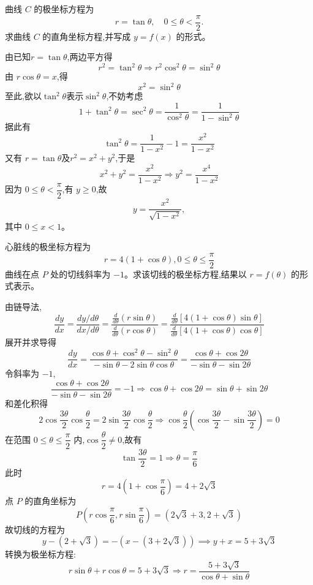 \begin{questions}
    \question 曲线 $C$ 的极坐标方程为
    \[
    r=\tan\theta,\quad 0\le\theta<\frac{\pi}{2}.
    \]
    求曲线 $C$ 的直角坐标方程,并写成 $y=f(x)$ 的形式。
    \begin{solution}
        由已知$r=\tan\theta$,两边平方得
        \[
        r^2=\tan^2\theta \Rightarrow r^2\cos^2\theta=\sin^2\theta
        \]
        由 $r\cos\theta=x$,得
        \[
        x^2=\sin^2\theta
        \]
        至此,欲以$\tan^2\theta$表示$\sin^2\theta$,不妨考虑
        \[
        1+\tan^2\theta=\sec^2\theta=\frac{1}{\cos^2 \theta}=\frac{1}{1-\sin^2 \theta}
        \]
        据此有
        \[
        \tan^2\theta=\frac{1}{1-x^2}-1=\frac{x^2}{1-x^2}
        \]
        又有 $r=\tan\theta$及$r^2=x^2+y^2$,于是
        \[
        x^2+y^2=\frac{x^2}{1-x^2} \Rightarrow y^2=\frac{x^4}{1-x^2}
        \]
        因为 $0\le\theta<\dfrac{\pi}{2}$,有 $y\ge0$,故
        \[
        y=\frac{x^2}{\sqrt{1-x^2}},
        \]
        其中 $0\le x<1$。
    \end{solution}

    \question 心脏线的极坐标方程为 
    \[
    r=4(1+\cos \theta),0 \le \theta \le \frac{\pi}{2}
    \]
    曲线在点 $P$ 处的切线斜率为 $-1$。求该切线的极坐标方程,结果以 $r=f(\theta)$ 的形式表示。
    \begin{solution}
        由链导法,
        \[ 
        \frac{dy}{dx} = \frac{dy/d\theta}{dx/d\theta} = \frac{\frac{d}{d\theta}(r \sin \theta)}{\frac{d}{d\theta}(r \cos \theta)} = \frac{\frac{d}{d\theta}[4(1+\cos \theta)\sin \theta]}{\frac{d}{d\theta}[4(1+\cos \theta)\cos \theta]} 
        \]
        展开并求导得
        \[ 
        \frac{dy}{dx} = \frac{\cos \theta + \cos^2 \theta - \sin^2 \theta}{-\sin \theta - 2\sin \theta \cos \theta} = \frac{\cos \theta + \cos 2\theta}{-\sin \theta - \sin 2\theta} 
        \]
        令斜率为 $-1$,
        \[ 
        \frac{\cos \theta + \cos 2\theta}{-\sin \theta - \sin 2\theta} = -1 \Rightarrow \cos \theta + \cos 2\theta = \sin \theta + \sin 2\theta 
        \]
        和差化积得
        \[ 
        2\cos \frac{3\theta}{2} \cos \frac{\theta}{2} = 2\sin \frac{3\theta}{2} \cos \frac{\theta}{2} \Rightarrow
        \cos \frac{\theta}{2} \left( \cos \frac{3\theta}{2} - \sin \frac{3\theta}{2} \right) = 0 
        \]
        在范围 $0 \le \theta \le \dfrac{\pi}{2}$ 内,$\cos \dfrac{\theta}{2} \neq 0$,故有
        \[ 
        \tan \frac{3\theta}{2} = 1 \Rightarrow \theta = \frac{\pi}{6} 
        \]
        此时
        \[ 
        r = 4\left(1 + \cos \frac{\pi}{6}\right) = 4 + 2\sqrt{3} 
        \]
        点 $P$ 的直角坐标为
        \[ 
        P\left(r \cos \frac{\pi}{6},r \sin \frac{\pi}{6}\right) = (2\sqrt{3} + 3 ,2 + \sqrt{3})
        \]
        故切线的方程为 
        \[ 
        y - (2 + \sqrt{3}) = -(x - (3 + 2\sqrt{3})) \implies y + x = 5 + 3\sqrt{3} 
        \]
        转换为极坐标方程:
        \[ 
        r\sin \theta + r\cos \theta = 5 + 3\sqrt{3} \Rightarrow r = \frac{5 + 3\sqrt{3}}{\cos \theta + \sin \theta} 
        \]
    \end{solution}


\end{questions}
